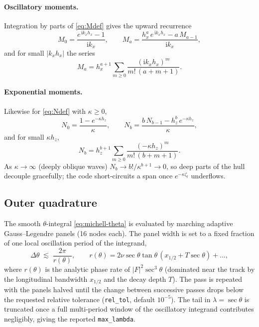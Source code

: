 \documentclass[11pt]{article}
\newcommand{\ii}{\mathrm{i}}
\begin{document}
\paragraph{Oscillatory moments.} Integration by parts of \eqref{eq:Mdef} gives
the upward recurrence
\begin{equation}
  M_0 = \frac{e^{\,\ii k_x h_x} - 1}{\ii k_x},
  \qquad
  M_a = \frac{h_x^{a}\,e^{\,\ii k_x h_x} - a\,M_{a-1}}{\ii k_x},
  \label{eq:Mrec}
\end{equation}
and for small $|k_x h_x|$ the series
\begin{equation}
  M_a = h_x^{a+1}\sum_{m\ge 0}
    \frac{(\ii k_x h_x)^{m}}{m!\,(a+m+1)}.
  \label{eq:Mseries}
\end{equation}

\paragraph{Exponential moments.} Likewise for \eqref{eq:Ndef} with $\kappa \ge 0$,
\begin{equation}
  N_0 = \frac{1 - e^{-\kappa h_z}}{\kappa},
  \qquad
  N_b = \frac{b\,N_{b-1} - h_z^{b}\,e^{-\kappa h_z}}{\kappa},
  \label{eq:Nrec}
\end{equation}
and for small $\kappa h_z$,
\begin{equation}
  N_b = h_z^{b+1}\sum_{m\ge 0}
    \frac{(-\kappa h_z)^{m}}{m!\,(b+m+1)}.
  \label{eq:Nseries}
\end{equation}
As $\kappa \to \infty$ (deeply oblique waves) $N_b \to b!/\kappa^{b+1} \to 0$,
so deep parts of the hull decouple gracefully; the code short-circuits a span
once $e^{-\kappa\zeta_t}$ underflows.

\subsection{Outer quadrature}
\label{sec:outer}

The smooth $\theta$-integral \eqref{eq:michell-theta} is evaluated by marching
adaptive Gauss--Legendre panels (16 nodes each). The panel width is set to a
fixed fraction of one local oscillation period of the integrand,
\begin{equation}
  \Delta\theta \;\lesssim\; \frac{2\pi}{r(\theta)},
  \qquad
  r(\theta) = 2\nu\sec\theta\tan\theta\,(x_{1/2} + T\sec\theta) + \dots,
\end{equation}
where $r(\theta)$ is the analytic phase rate of $|F|^{2}\sec^{3}\theta$
(dominated near the track by the longitudinal bandwidth $x_{1/2}$ and the decay
depth $T$). The pass is repeated with the panels halved until the change between
successive passes drops below the requested relative tolerance
(\texttt{rel\_tol}, default $10^{-5}$). The tail in $\lambda = \sec\theta$ is
truncated once a full multi-period window of the oscillatory integrand
contributes negligibly, giving the reported \texttt{max\_lambda}.
\end{document}
